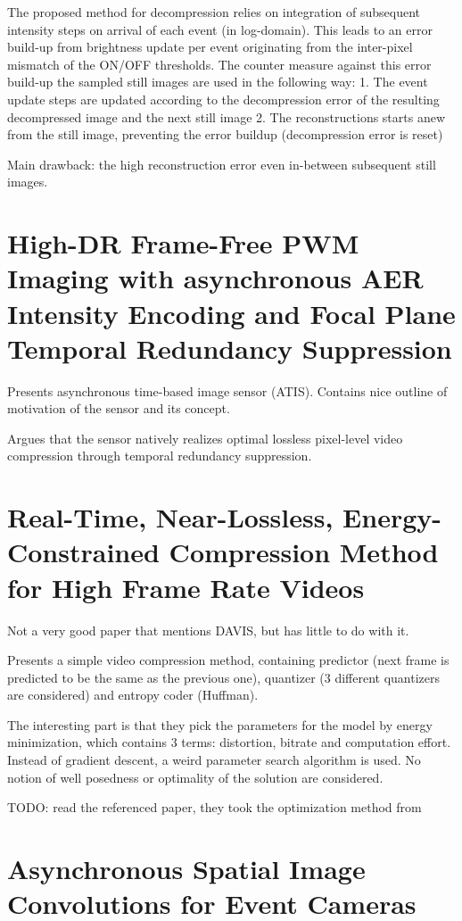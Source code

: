 \documentclass[10pt,a4paper]{article}
\begin{document}
The proposed method for decompression relies on integration of subsequent intensity steps on arrival of each event (in log-domain).
This leads to an error build-up from brightness update per event originating from the inter-pixel mismatch of the ON/OFF thresholds.
The counter measure against this error build-up the sampled still images are used in the following way:
1. The event update steps are updated according to the decompression error of the resulting decompressed image and the next still image
2. The reconstructions starts anew from the still image, preventing the error buildup (decompression error is reset)

Main drawback: the high reconstruction error even in-between subsequent still images.

\section{High-DR Frame-Free PWM Imaging with asynchronous AER Intensity Encoding and Focal Plane Temporal Redundancy Suppression}
Presents asynchronous time-based image sensor (ATIS).
Contains nice outline of motivation of the sensor and its concept.

Argues that the sensor natively realizes optimal lossless pixel-level video compression through temporal redundancy suppression.

\section{Real-Time, Near-Lossless, Energy-Constrained Compression Method for High Frame Rate Videos}
Not a very good paper that mentions DAVIS, but has little to do with it.

Presents a simple video compression method, containing predictor (next frame is predicted to be the same as the previous one),
quantizer (3 different quantizers are considered) and entropy coder (Huffman).

The interesting part is that they pick the parameters for the model by energy minimization, which contains 3 terms: distortion, bitrate and computation effort.
Instead of gradient descent, a weird parameter search algorithm is used. No notion of well posedness or optimality of the solution are considered.

TODO: read the referenced paper, they took the optimization method from

\section{Asynchronous Spatial Image Convolutions for Event Cameras}
\end{document}
